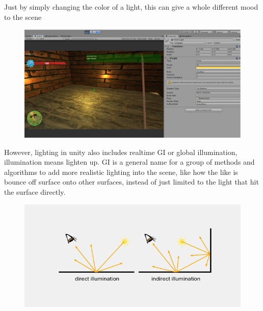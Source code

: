 \documentclass[a4paper, 13pt]{extarticle}
\begin{document}
{\begin{figure}[h]
{\begin{minipage}{.45\textwidth}
			\centering
			\label{fig:test27}
		\end{minipage}
	}
\end{figure}
  \vspace{5.5cm}
  Just by simply changing the color of a light, this can give a whole different mood to the scene
  \begin{figure}[h]
  	\begin{minipage}{1\textwidth}
  		\centering
  		\includegraphics[width=0.8\linewidth]{intructions/change_light_color.png}
  		\centering
  		\label{fig:test28}
  	\end{minipage}
  \end{figure}
 However, lighting in unity also includes realtime GI or global illumination, illumination means lighten up. GI is a general name for a group of methods and algorithms to add more realistic lighting into the scene, like how the like is bounce off surface onto other surfaces, instead of just limited to the light that hit the surface directly. 
 \begin{figure}[h]
 	\begin{minipage}{1\textwidth}
 		\centering
 		\includegraphics[width=0.8\linewidth]{intructions/light_categlories.png}
 		\centering
 		\end{minipage}
 	\end{figure}
 \\[0.05cm]
}
\end{document}
